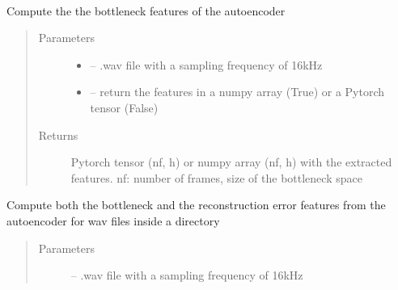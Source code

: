 \documentclass[letterpaper,10pt,english]{sphinxmanual}
\begin{document}
\begin{fulllineitems}
\label{\detokenize{RepLearning:AEspeech.AEspeech}}~

\begin{fulllineitems}
\label{\detokenize{RepLearning:AEspeech.AEspeech.compute_bottleneck_features}}
Compute the the bottleneck features of the autoencoder
\begin{quote}\begin{description}
\item[{Parameters}] \leavevmode\begin{itemize}
\item {} 
 -- .wav file with a sampling frequency of 16kHz

\item {} 
 -- return the features in a numpy array (True) or a Pytorch tensor (False)

\end{itemize}

\item[{Returns}] \leavevmode
Pytorch tensor (nf, h) or numpy array (nf, h) with the extracted features. nf: number of frames, size of the bottleneck space

\end{description}\end{quote}

\end{fulllineitems}


\begin{fulllineitems}
\label{\detokenize{RepLearning:AEspeech.AEspeech.compute_dynamic_features}}
Compute both the bottleneck and the reconstruction error features from the autoencoder for wav files inside a directory
\begin{quote}\begin{description}
\item[{Parameters}] \leavevmode
{} -- .wav file with a sampling frequency of 16kHz


\end{description}
\end{quote}
\end{fulllineitems}
\end{fulllineitems}
\end{document}
